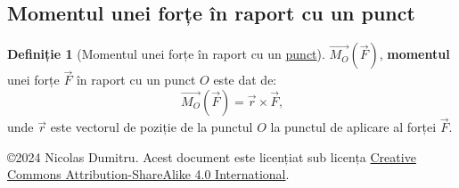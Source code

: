 \documentclass[a4paper]{article}
\theoremstyle{definition}
\newtheorem{definition}{Definiție}[section]
\theoremstyle{plain}%
\theoremstyle{remark}
\begin{document}
\subsection{Momentul unei forțe în raport cu un punct}

\begin{definition}[Momentul unei forțe în raport cu un \underline{punct}]
	\(\overrightarrow{M_O}(\vec F)\), \textbf{momentul} unei forțe \(\vec F\) în raport cu un punct \(O\) este dat de:
	\begin{equation*}
        \overrightarrow{M_O}(\vec F) = \vec r \times \vec F \text{,}
	\end{equation*}
	unde \(\vec r\) este vectorul de poziție de la punctul \(O\) la punctul de aplicare al forței \(\vec F\).
\end{definition}

\begin{flushright}
	\copyright 2024 Nicolas Dumitru.
	Acest document este licențiat sub licența \href{https://creativecommons.org/licenses/by-sa/4.0/}{Creative Commons Attribution-ShareAlike 4.0 International}.

\end{flushright}
\end{document}

